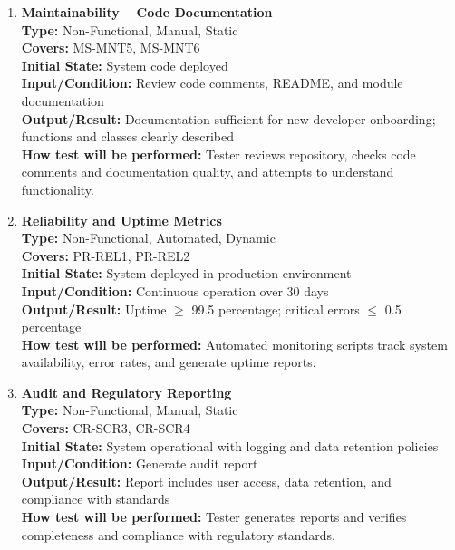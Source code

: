 \documentclass[12pt, titlepage]{article}
\begin{document}
\begin{enumerate}[label=NFR-ST \arabic*., wide=0pt, leftmargin=*]
  \item \textbf{Maintainability – Code Documentation} \\[2mm]
    \textbf{Type:} Non-Functional, Manual, Static \\
    \textbf{Covers:} MS-MNT5, MS-MNT6 \\
    \textbf{Initial State:} System code deployed \\
    \textbf{Input/Condition:} Review code comments, README, and
    module documentation \\
    \textbf{Output/Result:} Documentation sufficient for new
    developer onboarding; functions and classes clearly described \\[2mm]
    \textbf{How test will be performed:} Tester reviews repository,
    checks code comments and documentation quality, and attempts to
    understand functionality.

  \item \textbf{Reliability and Uptime Metrics} \\[2mm]
    \textbf{Type:} Non-Functional, Automated, Dynamic \\
    \textbf{Covers:} PR-REL1, PR-REL2 \\
    \textbf{Initial State:} System deployed in production environment \\
    \textbf{Input/Condition:} Continuous operation over 30 days \\
    \textbf{Output/Result:} Uptime $\ge$ 99.5 percentage; critical
    errors $\le$ 0.5 percentage \\[2mm]
    \textbf{How test will be performed:} Automated monitoring scripts
    track system availability, error rates, and generate uptime reports.

  \item \textbf{Audit and Regulatory Reporting} \\[2mm]
    \textbf{Type:} Non-Functional, Manual, Static \\
    \textbf{Covers:} CR-SCR3, CR-SCR4 \\
    \textbf{Initial State:} System operational with logging and data
    retention policies \\
    \textbf{Input/Condition:} Generate audit report \\
    \textbf{Output/Result:} Report includes user access, data
    retention, and compliance with standards \\[2mm]
    \textbf{How test will be performed:} Tester generates reports and
    verifies completeness and compliance with regulatory standards.


\end{enumerate}
\end{document}
